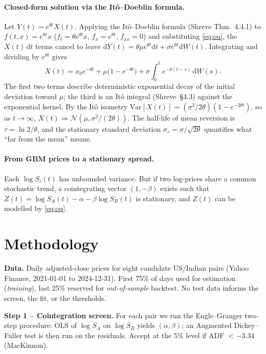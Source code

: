\documentclass[11pt,a4paper]{article}
\newcommand{\dd}{\mathrm{d}}
\newcommand{\Var}{\mathrm{Var}}
\begin{document}
\paragraph{Closed-form solution via the It\^o--Doeblin formula.}
Let $Y(t)=e^{\theta t}X(t)$. Applying the It\^o--Doeblin formula
(Shreve Thm.~4.4.1) to $f(t,x)=e^{\theta t}x$ ($f_t=\theta e^{\theta t}x$,
$f_x=e^{\theta t}$, $f_{xx}=0$) and substituting \eqref{eq:ou}, the
$X(t)\,\dd t$ terms cancel to leave
$\dd Y(t) = \theta\mu e^{\theta t}\dd t + \sigma e^{\theta t}\dd W(t)$.
Integrating and dividing by $e^{\theta t}$ gives
\begin{equation}
    X(t) = x_0 e^{-\theta t} + \mu\bigl(1-e^{-\theta t}\bigr)
           + \sigma\!\int_0^t e^{-\theta(t-s)}\,\dd W(s).
    \label{eq:ou-sol}
\end{equation}
The first two terms describe deterministic exponential decay of the initial
deviation toward $\mu$; the third is an It\^o integral (Shreve~\S4.3) against
the exponential kernel. By the It\^o isometry
$\Var[X(t)]=(\sigma^2/2\theta)(1-e^{-2\theta t})$, so as $t\to\infty$,
$X(t)\Rightarrow\mathcal{N}(\mu,\sigma^2/(2\theta))$. The half-life of
mean reversion is $\tau=\ln 2/\theta$, and the stationary standard deviation
$\sigma_s=\sigma/\sqrt{2\theta}$ quantifies what ``far from the mean'' means.

\paragraph{From GBM prices to a stationary spread.} Each $\log S_i(t)$ has
unbounded variance. But if two log-prices share a common stochastic trend,
a cointegrating vector $(1,-\beta)$ exists such that
$Z(t)=\log S_A(t)-\alpha-\beta\log S_B(t)$ is stationary, and
$Z(t)$ can be modelled by \eqref{eq:ou}.

\section{Methodology}

\textbf{Data.} Daily adjusted-close prices for eight candidate US/Indian pairs
(Yahoo Finance, 2021-01-01 to 2024-12-31). First 75\% of days used for
estimation (\emph{training}), last 25\% reserved for \emph{out-of-sample}
backtest. No test data informs the screen, the fit, or the thresholds.

\textbf{Step 1 -- Cointegration screen.} For each pair we run the
Engle--Granger two-step procedure: OLS of $\log S_A$ on $\log S_B$ yields
$(\alpha,\beta)$; an Augmented Dickey--Fuller test is then run on the residuals.
Accept at the 5\% level if ADF $<-3.34$ (MacKinnon).
\end{document}
